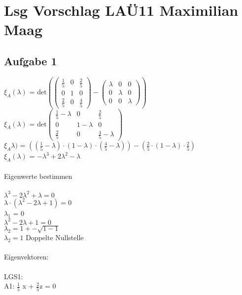 \documentclass{article}
\begin{document}
	\section*{Lsg Vorschlag LAÜ11 Maximilian Maag}
	\subsection*{Aufgabe 1}
	$\xi_{A}(\lambda)$ =
	det$\left(
	\left(
	\begin{array}{ccc}
	\frac{1}{5} & 0 & \frac{2}{5} \\ 0&1&0 \\ \frac{2}{5}&0&\frac{4}{5}
	\end{array}
	\right)
	-
	\left(
	\begin{array}{ccc}
	 \lambda&0&0\\ 0&\lambda&0 \\ 0&0&\lambda 
	\end{array}
	\right)
	\right)$ \\
	$\xi_{A}(\lambda)$ =
	det$\left(
	\begin{array}{ccc}
	\frac{1}{5} - \lambda & 0 & \frac{2}{5} \\ 0&1 - \lambda&0 \\ \frac{2}{5}&0&\frac{4}{5}  - \lambda
	\end{array}
	\right)$ \\
	$\xi_{A}\lambda)$ = $((\frac{1}{5} - \lambda) \cdot (1 - \lambda) \cdot (\frac{4}{5} - \lambda)) - (\frac{2}{5} \cdot (1 - \lambda) \cdot \frac{2}{5})$ \\
	$\xi_{A}(\lambda)$ = $-\lambda^{3} + 2\lambda^{2} - \lambda$ \\ \\
	Eigenwerte bestimmen \\
	\\
	$\lambda^{3} - 2\lambda^{2} + \lambda = 0$ \\
	$\lambda \cdot (\lambda^{2} - 2\lambda + 1) = 0$ \\
	$\lambda_{1}$  = 0 \\
	$\lambda^{2} - 2\lambda + 1 = 0$ \\
	$\lambda_{2} = 1 +-  \sqrt{1 - 1}$  \\
	$\lambda_{2} = 1$ Doppelte Nullstelle \\ 
	\\
	Eigenvektoren: \\ \\
	LGS1: \\
	A1: $\frac{1}{5}$ x + $\frac{2}{5}$z = 0 \\
\end{document}
